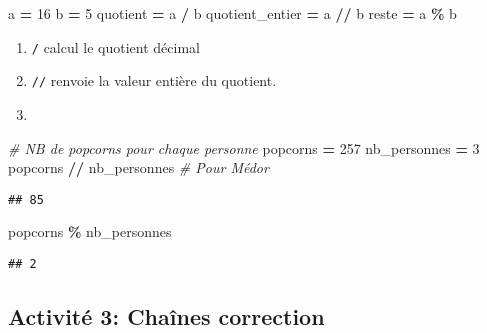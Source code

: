 \documentclass[
]{book}
\newenvironment{Shaded}{\begin{snugshade}}{\end{snugshade}}
\newcommand{\CommentTok}[1]{\textcolor[rgb]{0.56,0.35,0.01}{\textit{#1}}}
\newcommand{\DecValTok}[1]{\textcolor[rgb]{0.00,0.00,0.81}{#1}}
\newcommand{\NormalTok}[1]{#1}
\newcommand{\OperatorTok}[1]{\textcolor[rgb]{0.81,0.36,0.00}{\textbf{#1}}}
\providecommand{\tightlist}{%
  \setlength{\itemsep}{0pt}\setlength{\parskip}{0pt}}
\def\tightlist{}
\begin{document}
\begin{Shaded}
\begin{Highlighting}[]
\NormalTok{a }\OperatorTok{=} \DecValTok{16}
\NormalTok{b }\OperatorTok{=} \DecValTok{5}
\NormalTok{quotient }\OperatorTok{=}\NormalTok{ a }\OperatorTok{/}\NormalTok{ b}
\NormalTok{quotient\_entier }\OperatorTok{=}\NormalTok{ a }\OperatorTok{//}\NormalTok{ b}
\NormalTok{reste }\OperatorTok{=}\NormalTok{ a }\OperatorTok{\%}\NormalTok{ b}
\end{Highlighting}
\end{Shaded}

\begin{enumerate}
\def\labelenumi{\arabic{enumi}.}
\setcounter{enumi}{1}
\tightlist
\item
  \texttt{/} calcul le quotient décimal
\item
  \texttt{//} renvoie la valeur entière du quotient.
\item
\end{enumerate}

\begin{Shaded}
\begin{Highlighting}[]
\CommentTok{\# NB de popcorns pour chaque personne}
\NormalTok{popcorns }\OperatorTok{=} \DecValTok{257}
\NormalTok{nb\_personnes }\OperatorTok{=} \DecValTok{3}
\NormalTok{popcorns }\OperatorTok{//}\NormalTok{ nb\_personnes}
\CommentTok{\# Pour Médor}
\end{Highlighting}
\end{Shaded}

\begin{verbatim}
## 85
\end{verbatim}

\begin{Shaded}
\begin{Highlighting}[]
\NormalTok{popcorns }\OperatorTok{\%}\NormalTok{ nb\_personnes}
\end{Highlighting}
\end{Shaded}

\begin{verbatim}
## 2
\end{verbatim}

\newpage

\hypertarget{activituxe9-3-chauxeenes-correction}{%
\subsection{Activité 3: Chaînes correction}\label{activituxe9-3-chauxeenes-correction}}
\end{document}
